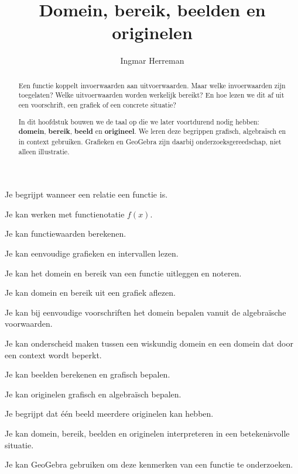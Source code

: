\documentclass{ximera}
\title{Domein, bereik, beelden en originelen}
\author{Ingmar Herreman}
\begin{document}









\begin{abstract}
Een functie koppelt invoerwaarden aan uitvoerwaarden. Maar welke invoerwaarden
zijn toegelaten? Welke uitvoerwaarden worden werkelijk bereikt? En hoe lezen we
dit af uit een voorschrift, een grafiek of een concrete situatie?

In dit hoofdstuk bouwen we de taal op die we later voortdurend nodig hebben:
\textbf{domein}, \textbf{bereik}, \textbf{beeld} en \textbf{origineel}.
We leren deze begrippen grafisch, algebraïsch en in context gebruiken.
Grafieken en GeoGebra zijn daarbij onderzoeksgereedschap, niet alleen illustratie.
\end{abstract}

\maketitle

\begin{voorkennis}
    \item Je begrijpt wanneer een relatie een functie is.
    \item Je kan werken met functienotatie \(f(x)\).
    \item Je kan functiewaarden berekenen.
    \item Je kan eenvoudige grafieken en intervallen lezen.
\end{voorkennis}

\begin{leerdoelen}
    \item Je kan het domein en bereik van een functie uitleggen en noteren.
    \item Je kan domein en bereik uit een grafiek aflezen.
    \item Je kan bij eenvoudige voorschriften het domein bepalen vanuit de algebraïsche voorwaarden.
    \item Je kan onderscheid maken tussen een wiskundig domein en een domein dat door een context wordt beperkt.
    \item Je kan beelden berekenen en grafisch bepalen.
    \item Je kan originelen grafisch en algebraïsch bepalen.
    \item Je begrijpt dat één beeld meerdere originelen kan hebben.
    \item Je kan domein, bereik, beelden en originelen interpreteren in een betekenisvolle situatie.
    \item Je kan GeoGebra gebruiken om deze kenmerken van een functie te onderzoeken.
\end{leerdoelen}
\end{document}
